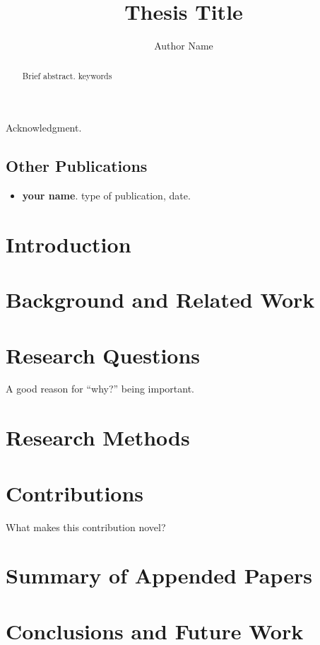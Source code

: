\documentclass{packages/kaucollection}
\title{Thesis Title}
\author{Author Name}
\institute{Department of Mathematics and Computer Science}
\begin{document}
\frontmatter
\begin{abstract}
  Brief abstract.
  \keywords keywords
\end{abstract}

\begin{acknowledgements}
  Acknowledgment.
\end{acknowledgements}

\listofpapers

\subsection*{Other Publications}
\begin{itemize}
  \item \textbf{your name}. type of publication, date.
\end{itemize}

\tableofcontents 


\mainmatter

\renewcommand*\headfont{\normalfont\small}
\section{Introduction}
\section{Background and Related Work}


\section{Research Questions}
\begin{researchquestions}
  \item[Why?] A good reason for ``why?'' being important.
\end{researchquestions}


\section{Research Methods}


\section{Contributions}
\begin{contributions}
  \item[Brief description.] What makes this contribution novel?
\end{contributions}


\section{Summary of Appended Papers}

\listofsummaries

\section{Conclusions and Future Work}

\renewcommand*\headfont{\normalfont\small}
\rehead{\thepaper}
\lohead{\thepapertitle}

 
\end{document}
